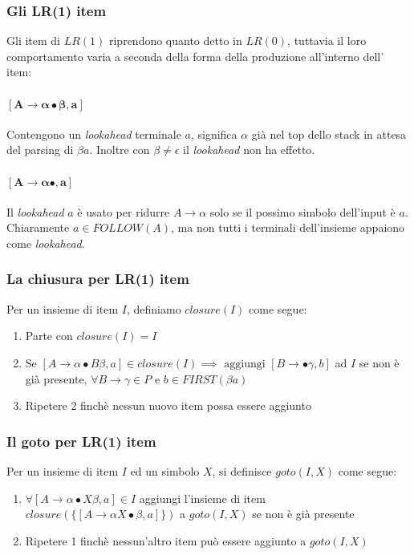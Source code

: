 \subsubsection{Gli LR(1) item}
Gli item di $LR(1)$ riprendono quanto detto in $LR(0)$, tuttavia il loro
comportamento varia a seconda della forma della produzione all'interno dell'
item:

\paragraph{$\mathbf{[A \to \alpha\bullet\beta,a]}$}
Contengono un \textit{lookahead} terminale $a$, significa $\alpha$ gi\`a nel
top dello stack in attesa del parsing di $\beta a$. Inoltre con $\beta \neq
\epsilon$ il \textit{lookahead} non ha effetto.

\paragraph{$\mathbf{[A \to \alpha\bullet,a]}$}
Il \textit{lookahead} $a$ \`e usato per ridurre $A \to \alpha$ solo se il
possimo simbolo dell'input \`e $a$. Chiaramente $a \in FOLLOW(A)$, ma non tutti
i terminali dell'insieme appaiono come \textit{lookahead}.

\subsubsection{La chiusura per LR(1) item}
\begin{definition}
Per un insieme di item $I$, definiamo $closure(I)$ come segue:
\begin{enumerate}
\item Parte con $closure(I) = I$
\item Se $[A \to \alpha\bullet B\beta,a] \in closure(I) \implies
\text{ aggiungi } [B \to \bullet\gamma, b]$ ad $I$ se non \`e gi\`a presente,
$\forall B \to \gamma \in P$ e $b \in FIRST(\beta a)$
\item Ripetere 2 finch\`e nessun nuovo item possa essere aggiunto
\end{enumerate}
\end{definition}

\subsubsection{Il goto per LR(1) item}
\begin{definition}
Per un insieme di item $I$ ed un simbolo $X$, si definisce $goto(I,X)$ come
segue:
\begin{enumerate}
\item $\forall [A \to \alpha\bullet X\beta,a] \in I$ aggiungi l'insieme di item
$closure(\{[A \to \alpha X\bullet\beta,a]\})$ a $goto(I,X)$ se non \`e gi\`a
presente
\item Ripetere 1 finch\`e nessun'altro item pu\`o essere aggiunto a $goto(I,X)$
\end{enumerate}
\end{definition}

